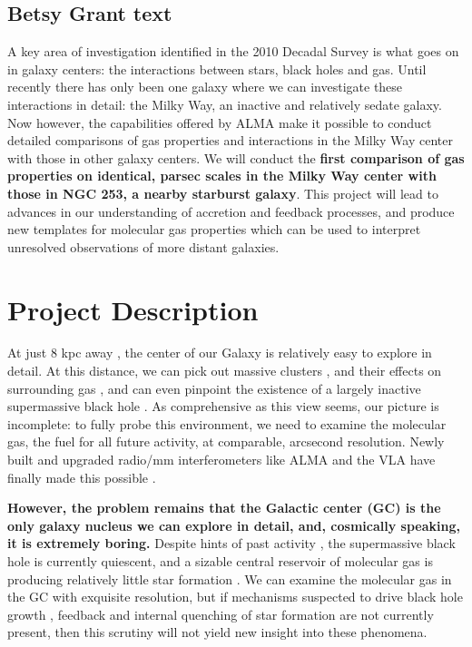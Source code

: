 \documentclass{article}
\begin{document}
\subsection{Betsy Grant text}
 A key area of investigation identified in the 2010 Decadal Survey is what goes on in galaxy centers: the interactions between stars, black holes and gas. Until recently there has only been one galaxy where we can investigate these interactions in detail: the Milky Way, an inactive and relatively sedate galaxy. Now however, the capabilities offered by ALMA make it possible to conduct detailed comparisons of gas properties and interactions in the Milky Way center with those in other galaxy centers. We will conduct the {\bf first comparison of gas properties on identical, parsec scales in the Milky Way center with those in NGC 253, a nearby starburst galaxy}. This project will lead to advances in our understanding of accretion and feedback processes, and produce new templates for molecular gas properties which can be used to interpret unresolved observations of more distant galaxies. 
\section{Project Description}  

At just 8 kpc away \citep{Boehle16}, the center of our Galaxy is relatively easy to explore in detail. At this distance, we can pick out massive clusters \citep{Clarkson12,Hussmann12,Lu13}, and their effects on surrounding gas \citep{Lang97,Lang01}, and can even pinpoint the existence of a largely inactive supermassive black hole \citep{Genzel96,Genzel97,Ghez98,Ghez08}. As comprehensive as this view seems, our picture is incomplete: to fully probe this environment, we need to examine the molecular gas, the fuel for all future activity, at comparable, arcsecond resolution. Newly built and upgraded radio/mm interferometers like ALMA and the VLA have finally made this possible \citep[e.g.,][]{Mills15, Rathborne15, Battersby17}. 

{\bf However, the problem remains that the Galactic center (GC) is the only galaxy nucleus we can explore in detail, and, cosmically speaking, it is extremely boring.} Despite hints of past activity \citep{Ponti10,SSF10,SF12}, the supermassive black hole is currently quiescent, and a sizable central reservoir of molecular gas is producing relatively little star formation \citep{Longmore13}. We can examine the molecular gas in the GC with exquisite resolution, but if mechanisms suspected to drive black hole growth \citep[through active accretion from a `torus';][]{LB69,Netzer15}, feedback and internal quenching of star formation \citep[either from star formation itself or AGN;][]{DS12,DM05} are not currently present, then this scrutiny will not yield new insight into these phenomena. %
\end{document}
